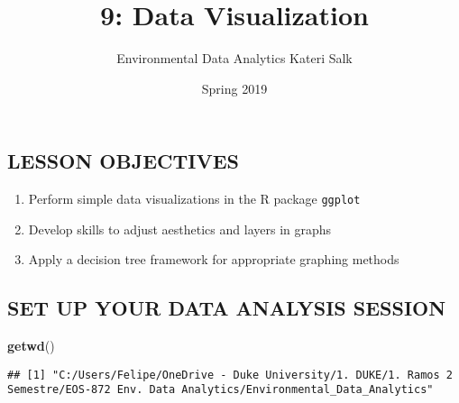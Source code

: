 \documentclass[]{article}
\title{9: Data Visualization}
\author{Environmental Data Analytics \textbar{} Kateri Salk}
\date{Spring 2019}
\newenvironment{Shaded}{\begin{snugshade}}{\end{snugshade}}
\newcommand{\KeywordTok}[1]{\textcolor[rgb]{0.13,0.29,0.53}{\textbf{#1}}}
\newcommand{\NormalTok}[1]{#1}
\providecommand{\tightlist}{%
  \setlength{\itemsep}{0pt}\setlength{\parskip}{0pt}}
\begin{document}
\maketitle

\subsection{LESSON OBJECTIVES}\label{lesson-objectives}

\begin{enumerate}
\def\labelenumi{\arabic{enumi}.}
\tightlist
\item
  Perform simple data visualizations in the R package \texttt{ggplot}
\item
  Develop skills to adjust aesthetics and layers in graphs
\item
  Apply a decision tree framework for appropriate graphing methods
\end{enumerate}

\subsection{SET UP YOUR DATA ANALYSIS
SESSION}\label{set-up-your-data-analysis-session}

\begin{Shaded}
\begin{Highlighting}[]
\KeywordTok{getwd}\NormalTok{()}
\end{Highlighting}
\end{Shaded}

\begin{verbatim}
## [1] "C:/Users/Felipe/OneDrive - Duke University/1. DUKE/1. Ramos 2 Semestre/EOS-872 Env. Data Analytics/Environmental_Data_Analytics"
\end{verbatim}
\end{document}
